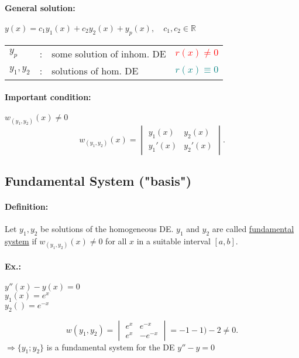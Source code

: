 \documentclass[]{article}
\begin{document}
\paragraph{General solution:} $y(x)=c_1y_1(x)+c_2y_2(x)+y_p(x),\quad c_1,c_2\in \mathbb R$\\
\begin{tabular}{l c l l}
	$y_p$ & : & some solution of inhom. DE & \textcolor{red}{$r(x)\not=0$}\\
	$y_1,y_2$ & : &solutions of hom. DE & \textcolor{teal}{$r(x)\equiv 0$}\\
\end{tabular}
\paragraph{Important condition:} $w_{(y_1,y_2)}(x)\not=0$
\[
	w_{(y_1,y_2)}(x)=
	\begin{vmatrix}
		y_1(x) & y_2(x) \\
		y_1'(x) & y_2'(x)
	\end{vmatrix}
.\]
\subsection{Fundamental System ("basis")}
\paragraph{Definition:} Let $y_1,y_2$ be solutions of the homogeneous DE. $y_1$ and $y_2$ are called \underline{fundamental system} if $w_{(y_1,y_2)}(x)\not=0$ for all $x$ in a suitable interval $[a,b]$.
\paragraph{Ex.:} 
\begin{multicols}{2}
$y''(x)-y(x)=0$\\
$y_1(x)=e ^{x}$\\
$y_2()= e ^{-x}$
\begin{center}
\end{center}
\end{multicols}
\[
w(y_1,y_2)= \begin{vmatrix}
	e ^{x} & e ^{-x}\\ e ^{x} & -e ^{-x}
\end{vmatrix} = -1-1)-2\not=0
.\]
$\Rightarrow \{y_1;y_2\}$ is a fundamental system for the DE $y''-y=0$
\end{document}
